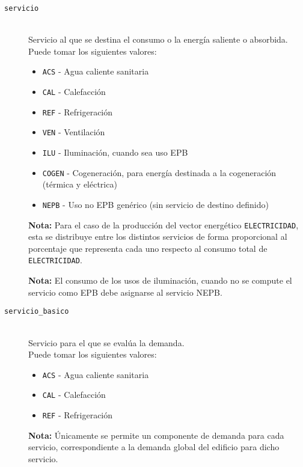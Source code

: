 \documentclass[10pt,notitlepage,oneside,a4paper]{article}
\begin{document}
\begin{description}
    \item [\texttt{servicio}] \hfill \\
          Servicio al que se destina el consumo o la energía saliente o absorbida.\\
          Puede tomar los siguientes valores:
          \begin{itemize}
              \item \texttt{ACS} - Agua caliente sanitaria
              \item \texttt{CAL} - Calefacción
              \item \texttt{REF} - Refrigeración
              \item \texttt{VEN} - Ventilación
              \item \texttt{ILU} - Iluminación, cuando sea uso EPB
              \item \texttt{COGEN} - Cogeneración, para energía destinada a la cogeneración (térmica y eléctrica)
              \item \texttt{NEPB} - Uso no EPB genérico (sin servicio de destino definido)
          \end{itemize}
          \begin{myquote}\small
              \textbf{Nota:} Para el caso de la producción del vector energético \texttt{ELECTRICIDAD}, esta se distribuye entre los distintos servicios de forma proporcional al porcentaje que representa cada uno respecto al consumo total de \texttt{ELECTRICIDAD}.

              \textbf{Nota:} El consumo de los usos de iluminación, cuando no se compute el servicio como EPB debe asignarse al servicio NEPB.
          \end{myquote}

    \item [\texttt{servicio\_basico}] \hfill \\
          Servicio para el que se evalúa la demanda.\\
          Puede tomar los siguientes valores:
          \begin{itemize}
              \item \texttt{ACS} - Agua caliente sanitaria
              \item \texttt{CAL} - Calefacción
              \item \texttt{REF} - Refrigeración
          \end{itemize}
          \begin{myquote}\small
              \textbf{Nota:} Únicamente se permite un componente de demanda para cada servicio, correspondiente a la demanda global del edificio para dicho servicio.
          \end{myquote}


\end{description}
\end{document}
